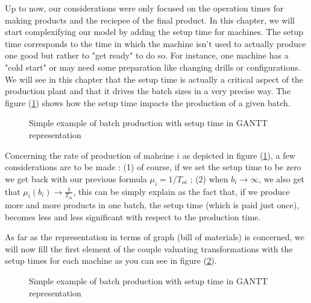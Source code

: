 Up to now, our considerations were only focused on the operation times for making products and the reciepee of the final product. In this chapter, we will start complexifying our model by adding the setup time for machines. The setup time corresponds to the time in which the machine isn't used to actually produce one good but rather to "get ready" to do so. For instance, one machine has a "cold start" or may need some preparation like changing drills or configurations. We will see in this chapter that the setup time is actually a critical aspect of the production plant and that it drives the batch sizes in a very precise way. The figure (\ref{setup:gant_ex}) shows how the setup time impacts the production of a given batch.

\begin{figure}[h!]
    \centering
    \caption{\label{setup:gant_ex}Simple example of batch production with setup time in GANTT representation}
\end{figure}

Concerning the rate of production of mahcine $i$ as depicted in figure (\ref{setup:gant_ex}), a few considerations are to be made : (1) of course, if we set the setup time to be zero we get back with our previous formula $\mu_i = 1/T_{oi}$ ; (2) when $b_i\rightarrow\infty$, we also get that $\mu_i(b_i)\rightarrow\frac{1}{T_{oi}}$, this can be simply explain as the fact that, if we produce more and more products in one batch, the setup time (which is paid just once), becomes less and less significant with respect to the production time.

As far as the representation in terms of graph (bill of materials) is concerned, we will now fill the first element of the couple valuating transformations with the setup times for each machine as you can see in figure (\ref{setup:graph_setup}).

\begin{figure}[h!]
    \centering
    \caption{\label{setup:graph_setup}Simple example of batch production with setup time in GANTT representation}
\end{figure}

